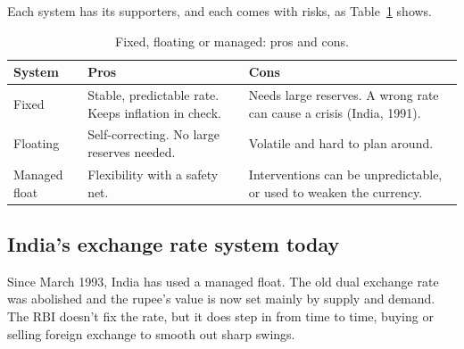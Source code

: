 Each system has its supporters, and each comes with risks, as Table~\ref{tab:systems} shows.

\begin{table}[!htb]
\centering\small\sffamily
\caption{Fixed, floating or managed: pros and cons.}\label{tab:systems}
\begin{tabularx}{\linewidth}{@{}>{\raggedright\arraybackslash}p{24mm}>{\raggedright\arraybackslash}X>{\raggedright\arraybackslash}X@{}}
\toprule
\textbf{System} & \textbf{Pros} & \textbf{Cons}\\
\midrule
Fixed & Stable, predictable rate. Keeps inflation in check. & Needs large reserves. A wrong rate can cause a crisis (India, 1991).\\
Floating & Self-correcting. No large reserves needed. & Volatile and hard to plan around.\\
Managed float & Flexibility with a safety net. & Interventions can be unpredictable, or used to weaken the currency.\\
\bottomrule
\end{tabularx}
\end{table}

\subsection{India's exchange rate system today}
Since March 1993, India has used a managed float. The old dual exchange rate was abolished and the rupee's value is now set mainly by supply and demand. The RBI doesn't fix the rate, but it does step in from time to time, buying or selling foreign exchange to smooth out sharp swings.

